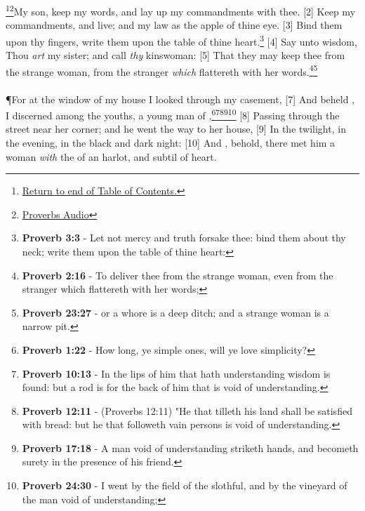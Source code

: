 \footnote{\textcolor[cmyk]{0.99998,1,0,0}{\hyperlink{TOC}{Return to end of Table of Contents.}}}\footnote{\href{https://audiobible.com/bible/proverbs_7.html}{\textcolor[cmyk]{0.99998,1,0,0}{Proverbs Audio}}}\textcolor[cmyk]{0.99998,1,0,0}{My son, keep my words, and lay up my commandments with thee.}
[2] \textcolor[cmyk]{0.99998,1,0,0}{Keep  my commandments, and live; and my law as the apple of thine eye.}
[3] \textcolor[cmyk]{0.99998,1,0,0}{Bind  them upon thy fingers, write them upon the table of thine heart.}\footnote{\textbf{Proverb 3:3} - Let not mercy and truth forsake thee: bind them about thy neck; write them upon the table of thine heart:}
[4] \textcolor[cmyk]{0.99998,1,0,0}{Say  unto wisdom, Thou \emph{art} my sister; and call  \emph{thy} kinswoman:}
[5] \textcolor[cmyk]{0.99998,1,0,0}{That  they may keep thee from the strange woman, from the stranger \emph{which} flattereth with her words.}\footnote{\textbf{Proverb 2:16} - To deliver thee from the strange woman, even from the stranger which flattereth with her words; }\footnote{\textbf{Proverb 23:27} - or a whore is a deep ditch; and a strange woman is a narrow pit.}\\
\\
\P \textcolor[cmyk]{0.99998,1,0,0}{For  at the window of my house I looked through my casement,}
[7] \textcolor[cmyk]{0.99998,1,0,0}{And  beheld    , I discerned among the youths, a young man  of ,}\footnote{\textbf{Proverb 1:22} - How long, ye simple ones, will ye love simplicity?}\footnote{\textbf{Proverb 10:13} - In the lips of him that hath understanding wisdom is found: but a rod is for the back of him that is void of understanding.}\footnote{\textbf{Proverb 12:11} - (Proverbs 12:11) "He that tilleth his land shall be satisfied with bread: but he that followeth vain persons is void of understanding.}\footnote{\textbf{Proverb 17:18} - A man void of understanding striketh hands, and becometh surety in the presence of his friend.}\footnote{\textbf{Proverb 24:30} -  I went by the field of the slothful, and by the vineyard of the man void of understanding;}
[8] \textcolor[cmyk]{0.99998,1,0,0}{Passing  through the street near her corner; and he went the way to her house,}
[9] \textcolor[cmyk]{0.99998,1,0,0}{In  the twilight, in the evening, in the black and dark night:}
[10] \textcolor[cmyk]{0.99998,1,0,0}{And , behold, there met him a woman \emph{with} the  of an harlot, and subtil of heart.}
